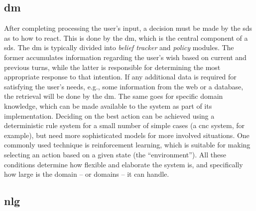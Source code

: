 
\subsection{\Acl{dm}}
\label{subsec:dialogue_management}

After completing processing the user's input, a decision must be made by the \ac{sds} as to how to react.
This is done by the \acf{dm}, which is the central component of a \ac{sds}.
The \ac{dm} is typically divided into \emph{belief tracker} and \emph{policy} modules.
The former accumulates information regarding the user's wish based on current and previous turns, while the latter is responsible for determining the most appropriate response to that intention.
If any additional data is required for satisfying the user's needs, e.g., some information from the web or a database, the retrieval will be done by the \ac{dm}.
The same goes for specific domain knowledge, which can be made available to the system as part of its implementation.
Deciding on the best action can be achieved using a deterministic rule system for a small number of simple cases (a \ac{cnc} system, for example), but need more sophisticated models for more involved situations.
One commonly used technique is reinforcement learning, which is suitable for making selecting an action based on a given state (the \enquote{environment}).
All these conditions determine how flexible and elaborate the system is, and specifically how large is the domain -- or domains -- it can handle.



\subsection{\Acl{nlg}}
\label{subsec:natural_language_generation}

